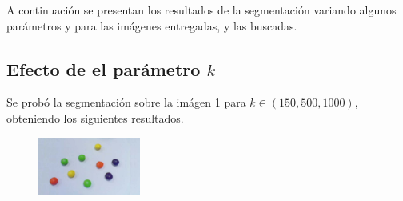 \documentclass[letterpaper,11pt]{article} %
\begin{document}
  A continuación se presentan los resultados de la segmentación variando algunos parámetros y para las imágenes entregadas, y las buscadas.

  \subsection{Efecto de el parámetro $k$}
    Se probó la segmentación sobre la imágen 1 para $k\in(150, 500, 1000)$, obteniendo los siguientes resultados.

    \begin{figure}[H]
      \centering
      \includegraphics[width=0.3\textwidth]{images/image_1}
      \vspace{0.5cm}


\end{figure}
\end{document}
